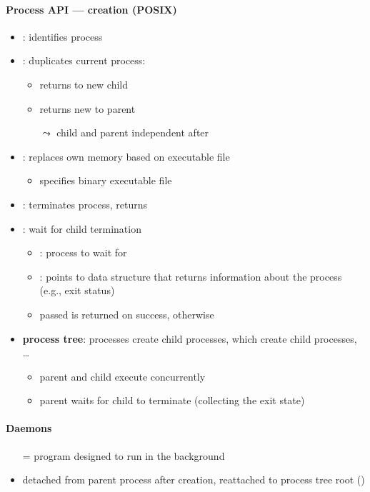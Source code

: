 \paragraph{Process API --- creation (POSIX)}
\begin{itemize}
  \item {}: identifies process
  \item {}: duplicates current process:
  \begin{itemize}
    \item returns  to new child
    \item returns new  to parent
    \item[$ \leadsto $] child and parent independent after 
  \end{itemize}
  \item {}: replaces own memory based on executable file
  \begin{itemize}
    \item {} specifies binary executable file
  \end{itemize}
  \item {}: terminates process, returns 
  \item {}: wait for child termination
  \begin{itemize}
    \item {}: process to wait for
    \item {}: points to data structure that returns information about the process (e.g., exit status)
    \item passed  is returned on success,  otherwise
  \end{itemize}
  \item \textbf{process tree}: processes create child processes, which create child processes, \dots
  \begin{itemize}
    \item parent and child execute concurrently
    \item parent waits for child to terminate (collecting the exit state)
  \end{itemize}
\end{itemize}

\paragraph{Daemons}
\begin{itemize}
  \item[=] program designed to run in the background
  \item detached from parent process after creation, reattached to process tree root ()
\end{itemize}

